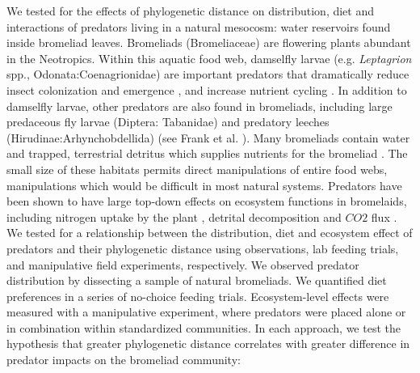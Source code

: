 \documentclass[11pt]{article}
\begin{document}
We tested for the effects of phylogenetic distance on distribution, diet
and interactions of predators living in a natural mesocosm: water
reservoirs found inside bromeliad leaves. Bromeliads (Bromeliaceae) are
flowering plants abundant in the Neotropics. Within this aquatic food
web, damselfly larvae (e.g. \emph{Leptagrion} spp.,
Odonata:Coenagrionidae) are important predators that dramatically reduce
insect colonization \citealt{Hammill2015} and emergence
\citealt{Starzomski2010}, and increase nutrient cycling \citealt{Ngai2006}.
In addition to damselfly larvae, other predators are also found in
bromeliads, including large predaceous fly larvae (Diptera: Tabanidae)
and predatory leeches (Hirudinae:Arhynchobdellida) (see Frank et al.
\citeyearpar{Frank2009}). Many bromeliads contain water and trapped,
terrestrial detritus which supplies nutrients for the bromeliad
\citealt{Reich2003a}. The small size of these habitats permits direct
manipulations of entire food webs, manipulations which would be
difficult in most natural systems. Predators have been shown to have
large top-down effects on ecosystem functions in bromelaids, including
nitrogen uptake by the plant \citealt{Ngai2006}, detrital decomposition
and $CO2$ flux \citealt{Atwood2014, Atwood2013}.
We tested for a relationship between the distribution, diet and
ecosystem effect of predators and their phylogenetic distance using
observations, lab feeding trials, and manipulative field experiments,
respectively. We observed predator distribution by dissecting a sample
of natural bromeliads. We quantified diet preferences in a series of
no-choice feeding trials. Ecosystem-level effects were measured with a
manipulative experiment, where predators were placed alone or in
combination within standardized communities. In each approach, we test
the hypothesis that greater phylogenetic distance correlates with
greater difference in predator impacts on the bromeliad community:
\end{document}
